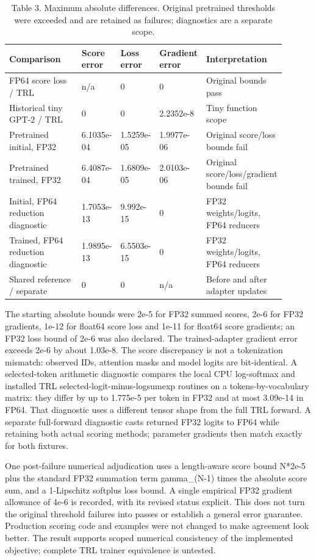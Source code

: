 \documentclass[10pt]{article}
\begin{document}
\begin{table}[htbp]\centering\footnotesize\caption{Table 3. Maximum absolute differences. Original pretrained thresholds were exceeded and are retained as failures; diagnostics are a separate scope.}
\begin{tabular}{p{0.275\linewidth}p{0.125\linewidth}p{0.125\linewidth}p{0.125\linewidth}p{0.250\linewidth}}
\toprule
Comparison & Score error & Loss error & Gradient error & Interpretation \\ \midrule
FP64 score loss / TRL & n/a & 0 & 0 & Original bounds pass \\
Historical tiny GPT-2 / TRL & 0 & 0 & 2.2352e-8 & Tiny function scope \\
Pretrained initial, FP32 & 6.1035e-04 & 1.5259e-05 & 1.9977e-06 & Original score/loss bounds fail \\
Pretrained trained, FP32 & 6.4087e-04 & 1.6809e-05 & 2.0103e-06 & Original score/loss/gradient bounds fail \\
Initial, FP64 reduction diagnostic & 1.7053e-13 & 9.992e-15 & 0 & FP32 weights/logits, FP64 reducers \\
Trained, FP64 reduction diagnostic & 1.9895e-13 & 6.5503e-15 & 0 & FP32 weights/logits, FP64 reducers \\
Shared reference / separate & 0 & 0 & n/a & Before and after adapter updates \\
\bottomrule\end{tabular}\end{table}

The starting absolute bounds were 2e-5 for FP32 summed scores, 2e-6 for FP32 gradients, 1e-12 for float64 score loss and 1e-11 for float64 score gradients; an FP32 loss bound of 2e-6 was also declared. The trained-adapter gradient error exceeds 2e-6 by about 1.03e-8. The score discrepancy is not a tokenization mismatch: observed IDs, attention masks and model logits are bit-identical. A selected-token arithmetic diagnostic compares the local CPU log-softmax and installed TRL selected-logit-minus-logsumexp routines on a tokens-by-vocabulary matrix: they differ by up to 1.775e-5 per token in FP32 and at most 3.09e-14 in FP64. That diagnostic uses a different tensor shape from the full TRL forward. A separate full-forward diagnostic casts returned FP32 logits to FP64 while retaining both actual scoring methods; parameter gradients then match exactly for both fixtures.


One post-failure numerical adjudication uses a length-aware score bound N*2e-5 plus the standard FP32 summation term gamma\_(N-1) times the absolute score sum, and a 1-Lipschitz softplus loss bound. A single empirical FP32 gradient allowance of 4e-6 is recorded, with its revised status explicit. This does not turn the original threshold failures into passes or establish a general error guarantee. Production scoring code and examples were not changed to make agreement look better. The result supports scoped numerical consistency of the implemented objective; complete TRL trainer equivalence is untested.
\end{document}
